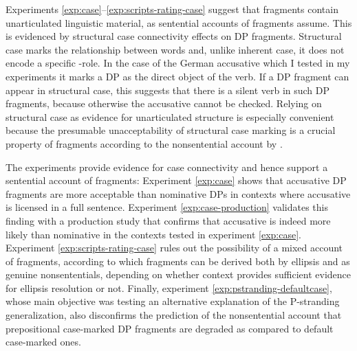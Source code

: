 Experiments \ref{exp:case}--\ref{exp:scripts-rating-case} suggest that fragments contain unarticulated linguistic material, as sentential accounts of fragments assume. This is evidenced by structural case connectivity effects on DP fragments. Structural case marks the relationship between words and, unlike inherent case, it does not encode a specific \texttheta-role. In the case of the German accusative which I tested in my experiments it marks a DP as the direct object of the verb. If a DP fragment can appear in structural case, this suggests that there is a silent verb in such DP fragments, because otherwise the accusative cannot be checked. Relying on structural case as evidence for unarticulated structure is especially convenient because the presumable unacceptability of structural case marking is a crucial property of fragments according to the nonsentential account by  \citet{barton.progovac2005}.

The experiments provide evidence for case connectivity and hence support a sentential account of fragments: Experiment \ref{exp:case} shows that accusative DP fragments are more acceptable than nominative DPs in contexts where accusative is licensed in a full sentence. Experiment \ref{exp:case-production} validates this finding with a production study that confirms that accusative is indeed more likely than nominative in the contexts tested in experiment \ref{exp:case}. Experiment \ref{exp:scripts-rating-case} rules out the possibility of a mixed account of fragments, according to which fragments can be derived both by ellipsis and as genuine nonsententials, depending on whether context provides sufficient evidence for ellipsis resolution or not. Finally, experiment \ref{exp:pstranding-defaultcase}, whose main objective was testing an alternative explanation of the P-stranding generalization, also disconfirms the prediction of the nonsentential account that prepositional case-marked DP fragments are degraded as compared to default case-marked ones.


